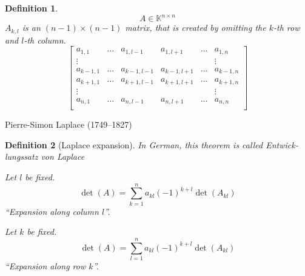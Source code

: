 \documentclass{article}
\newtheorem{definition}{Definition}  \numberwithin{definition}{section}
\begin{document}
\begin{definition}
  \[ A \in \mathbb K^{n\times n} \]
  $A_{k,l}$ is an $(n-1) \times (n-1)$ matrix, that is created by omitting the $k$-th row and $l$-th column.
  \[
    \begin{bmatrix}
      a_{1,1} & \ldots & a_{1,l-1} & a_{1,l+1} & \ldots & a_{1,n} \\
      \vdots  &        &           &           &        & \vdots \\
      a_{k-1,1} & \ldots & a_{k-1,l-1} & a_{k-1,l+1} & \ldots & a_{k-1,n} \\
      a_{k+1,1} & \ldots & a_{k+1,l-1} & a_{k+1,l+1} & \ldots & a_{k+1,n} \\
      \vdots  &        &           &           &        & \vdots \\
      a_{n,1} & \ldots & a_{n,l-1} & a_{n,l+1} & \ldots & a_{n,n} \\
    \end{bmatrix}
  \]
\end{definition}

Pierre-Simon Laplace (1749--1827)
\begin{definition}[Laplace expansion] %
  In German, this theorem is called \foreignlanguage{german}{Entwicklungssatz von Laplace}
  
  Let $l$ be fixed.
  \[ \det(A) = \sum_{k=1}^n a_{kl} (-1)^{k+l} \det(A_{kl}) \]
  \enquote{Expansion along column $l$}.

  Let $k$ be fixed.
  \[ \det(A) = \sum_{l=1}^n a_{kl} (-1)^{k+l} \det(A_{kl}) \]
  \enquote{Expansion along row $k$}.
\end{definition}
\end{document}
